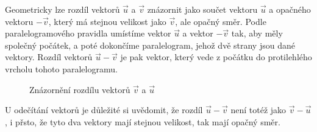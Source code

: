 Geometricky lze rozdíl vektorů $\vec{u}$ a $\vec{v}$ znázornit jako součet vektoru $\vec{u}$ a opačného vektoru $-\vec{v}$, který má stejnou velikost jako $\vec{v}$, ale opačný směr.
Podle paralelogramového pravidla umístíme vektor $\vec{u}$ a vektor $-\vec{v}$ tak, aby měly společný počátek, a poté dokončíme paralelogram, jehož dvě strany jsou dané vektory.
Rozdíl vektorů $\vec{u} - \vec{v}$ je pak vektor, který vede z počátku do protilehlého vrcholu tohoto paralelogramu.

\begin{figure}[H]
    \centering
    \caption{Znázornění rozdílu vektorů $\vec{v}$ a $\vec{u}$}
    \label{fig:vector_subtraction_example1}
\end{figure}

U odečítání vektorů je důležité si uvědomit, že rozdíl $\vec{u} - \vec{v}$ není totéž jako $\vec{v} - \vec{u}$, 
i přsto, že tyto dva vektory mají stejnou velikost, tak mají opačný směr.

